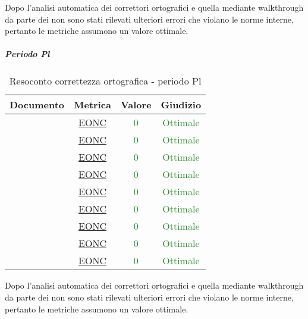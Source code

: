 					Dopo l'analisi automatica dei correttori ortografici e quella mediante walkthrough da parte dei \verificatori{} non sono stati rilevati ulteriori errori che violano le norme interne, pertanto le metriche assumono un valore ottimale.
					
				\subparagraph{Periodo Pl}
				
						\begin{table}[H]
						\centering
						\small
						\begin{tabular}{c | c | c | c}
							\hline
							\textbf{Documento} & \textbf{Metrica} & \textbf{Valore} & \textbf{Giudizio} \\
							\hline
							\pdpvdue  &     \hyperref[MCO]{EONC} & \textcolor{ForestGreen}{0} & \textcolor{ForestGreen}{Ottimale} \\
							\pdqvdue  &      \hyperref[MCO]{EONC} & \textcolor{ForestGreen}{0} & \textcolor{ForestGreen}{Ottimale} \\
							\ndpvdue   &   \hyperref[MCO]{EONC} & \textcolor{ForestGreen}{0} & \textcolor{ForestGreen}{Ottimale} \\
							\adrvdue   &   \hyperref[MCO]{EONC} & \textcolor{ForestGreen}{0} & \textcolor{ForestGreen}{Ottimale} \\
							\stvuno &	\hyperref[MCO]{EONC} & \textcolor{ForestGreen}{0} & \textcolor{ForestGreen}{Ottimale} \\
							\glvdue &     \hyperref[MCO]{EONC} & \textcolor{ForestGreen}{0} & \textcolor{ForestGreen}{Ottimale} \\
							\vcinquei&      \hyperref[MCO]{EONC} & \textcolor{ForestGreen}{0} & \textcolor{ForestGreen}{Ottimale} \\
							\vseii   &  \hyperref[MCO]{EONC} & \textcolor{ForestGreen}{0} & \textcolor{ForestGreen}{Ottimale} \\
							\vtree   &  \hyperref[MCO]{EONC} & \textcolor{ForestGreen}{0} & \textcolor{ForestGreen}{Ottimale} \\
							\hline
						\end{tabular}
						\caption{Resoconto correttezza ortografica - periodo Pl}
						\label{tab_resoconto_correttezza_ortografica_PPL}
					\end{table}

					Dopo l'analisi automatica dei correttori ortografici e quella mediante walkthrough da parte dei \verificatori{} non sono stati rilevati ulteriori errori che violano le norme interne, pertanto le metriche assumono un valore ottimale.
						
